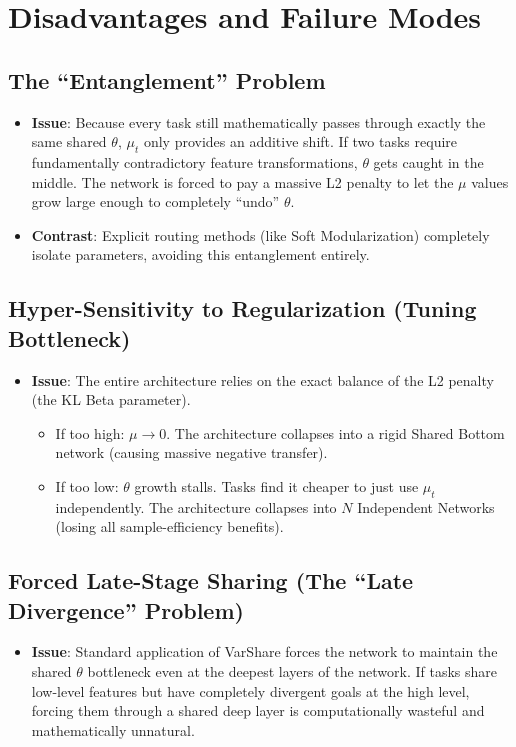 \documentclass[11pt,a4paper]{article}
\begin{document}
\section{Disadvantages and Failure Modes}

\subsection{The ``Entanglement'' Problem}
\begin{itemize}
    \item \textbf{Issue}: Because every task still mathematically passes through exactly the same shared $\theta$, $\mu_t$ only provides an additive shift. If two tasks require fundamentally contradictory feature transformations, $\theta$ gets caught in the middle. The network is forced to pay a massive L2 penalty to let the $\mu$ values grow large enough to completely ``undo'' $\theta$.
    \item \textbf{Contrast}: Explicit routing methods (like Soft Modularization) completely isolate parameters, avoiding this entanglement entirely.
\end{itemize}

\subsection{Hyper-Sensitivity to Regularization (Tuning Bottleneck)}
\begin{itemize}
    \item \textbf{Issue}: The entire architecture relies on the exact balance of the L2 penalty (the KL Beta parameter). 
    \begin{itemize}
        \item If too high: $\mu \to 0$. The architecture collapses into a rigid Shared Bottom network (causing massive negative transfer).
        \item If too low: $\theta$ growth stalls. Tasks find it cheaper to just use $\mu_t$ independently. The architecture collapses into $N$ Independent Networks (losing all sample-efficiency benefits).
    \end{itemize}
\end{itemize}

\subsection{Forced Late-Stage Sharing (The ``Late Divergence'' Problem)}
\begin{itemize}
    \item \textbf{Issue}: Standard application of VarShare forces the network to maintain the shared $\theta$ bottleneck even at the deepest layers of the network. If tasks share low-level features but have completely divergent goals at the high level, forcing them through a shared deep layer is computationally wasteful and mathematically unnatural.
\end{itemize}
\end{document}

